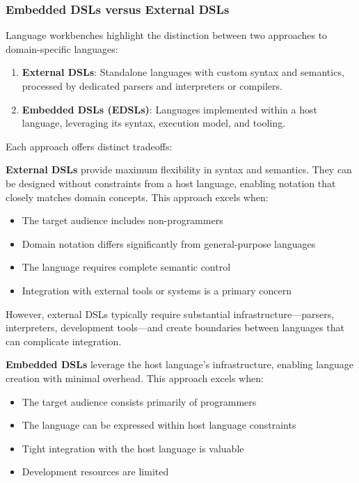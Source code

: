 \documentclass[11pt]{article}
\begin{document}
\subsubsection{Embedded DSLs versus External DSLs}
\label{sec:orgd159a76}

Language workbenches highlight the distinction between two approaches to domain-specific languages:

\begin{enumerate}
\item \textbf{External DSLs}: Standalone languages with custom syntax and semantics, processed by dedicated parsers and interpreters or compilers.

\item \textbf{Embedded DSLs (EDSLs)}: Languages implemented within a host language, leveraging its syntax, execution model, and tooling.
\end{enumerate}

Each approach offers distinct tradeoffs:

\textbf{\textbf{External DSLs}} provide maximum flexibility in syntax and semantics. They can be designed without constraints from a host language, enabling notation that closely matches domain concepts. This approach excels when:

\begin{itemize}
\item The target audience includes non-programmers
\item Domain notation differs significantly from general-purpose languages
\item The language requires complete semantic control
\item Integration with external tools or systems is a primary concern
\end{itemize}

However, external DSLs typically require substantial infrastructure—parsers, interpreters, development tools—and create boundaries between languages that can complicate integration.

\textbf{\textbf{Embedded DSLs}} leverage the host language's infrastructure, enabling language creation with minimal overhead. This approach excels when:

\begin{itemize}
\item The target audience consists primarily of programmers
\item The language can be expressed within host language constraints
\item Tight integration with the host language is valuable
\item Development resources are limited
\end{itemize}
\end{document}
